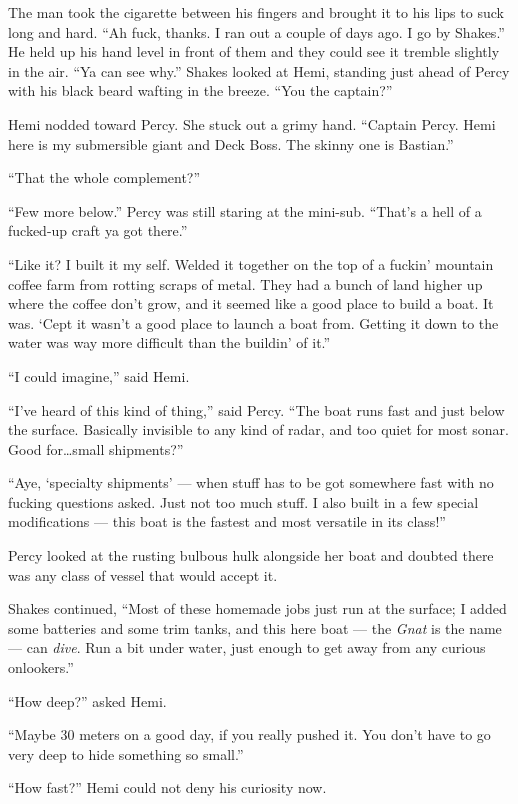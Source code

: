 \documentclass[
]{scrbook}
\begin{document}
The man took the cigarette between his fingers and brought it to his
lips to suck long and hard. ``Ah fuck, thanks. I ran out a couple of
days ago. I go by Shakes.'' He held up his hand level in front of them
and they could see it tremble slightly in the air. ``Ya can see why.''
Shakes looked at Hemi, standing just ahead of Percy with his black beard
wafting in the breeze. ``You the captain?''

Hemi nodded toward Percy. She stuck out a grimy hand. ``Captain Percy.
Hemi here is my submersible giant and Deck Boss. The skinny one is
Bastian.''

``That the whole complement?''

``Few more below.'' Percy was still staring at the mini-sub. ``That's a
hell of a fucked-up craft ya got there.''

``Like it? I built it my self. Welded it together on the top of a
fuckin' mountain coffee farm from rotting scraps of metal. They had a
bunch of land higher up where the coffee don't grow, and it seemed like
a good place to build a boat. It was. `Cept it wasn't a good place to
launch a boat from. Getting it down to the water was way more difficult
than the buildin' of it.''

``I could imagine,'' said Hemi.

``I've heard of this kind of thing,'' said Percy. ``The boat runs fast
and just below the surface. Basically invisible to any kind of radar,
and too quiet for most sonar. Good for\ldots small shipments?''

``Aye, `specialty shipments' --- when stuff has to be got somewhere fast
with no fucking questions asked. Just not too much stuff. I also built
in a few special modifications --- this boat is the fastest and most
versatile in its class!''

Percy looked at the rusting bulbous hulk alongside her boat and doubted
there was any class of vessel that would accept it.

Shakes continued, ``Most of these homemade jobs just run at the surface;
I added some batteries and some trim tanks, and this here boat --- the
\emph{Gnat} is the name --- can \emph{dive}. Run a bit under water, just
enough to get away from any curious onlookers.''

``How deep?'' asked Hemi.

``Maybe 30 meters on a good day, if you really pushed it. You don't have
to go very deep to hide something so small.''

``How fast?'' Hemi could not deny his curiosity now.
\end{document}

